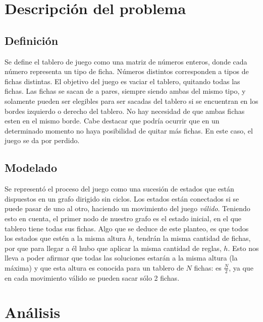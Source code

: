 \documentclass[a4paper,10pt]{article}
\begin{document}
\setcounter{page}{1}


\section{Descripción del problema}

    \subsection{Definición}


    Se define el tablero de juego como una matriz de números enteros, donde cada número representa un tipo de ficha. Números distintos corresponden a tipos de fichas distintas. 
    El objetivo del juego es vaciar el tablero, quitando todas las fichas. Las fichas se sacan de a pares, siempre siendo ambas del mismo tipo, y solamente pueden ser elegibles 
    para ser sacadas del tablero si se encuentran en los bordes izquierdo o derecho del tablero. No hay necesidad de que ambas fichas esten en el mismo borde. Cabe destacar 
    que podría ocurrir que en un determinado momento no haya posibilidad de quitar más fichas. En este caso, el juego se da por perdido.

    \subsection{Modelado}
    \label{problem-info}
    Se representó el proceso del juego como una sucesión de estados que están dispuestos en un grafo dirigido sin ciclos. Los estados están conectados si se puede pasar de uno 
    al otro, haciendo un movimiento del juego \textit{válido}. Teniendo esto en cuenta, el primer nodo de nuestro grafo es el estado inicial, en el que tablero tiene todas sus fichas. 
    Algo que se deduce de este planteo, es que todos los estados que estén a la misma altura $h$, tendrán la misma cantidad de fichas, por que para llegar a él hubo que aplicar 
    la misma cantidad de reglas, $h$. Esto nos lleva a poder afirmar que todas las soluciones estarán a la misma altura (la máxima) y que esta altura es conocida para un 
    tablero de $N$ fichas: es $\frac{N}{2}$, ya que en cada movimiento válido se pueden sacar sólo 2 fichas.

\section{Análisis}
\end{document}
